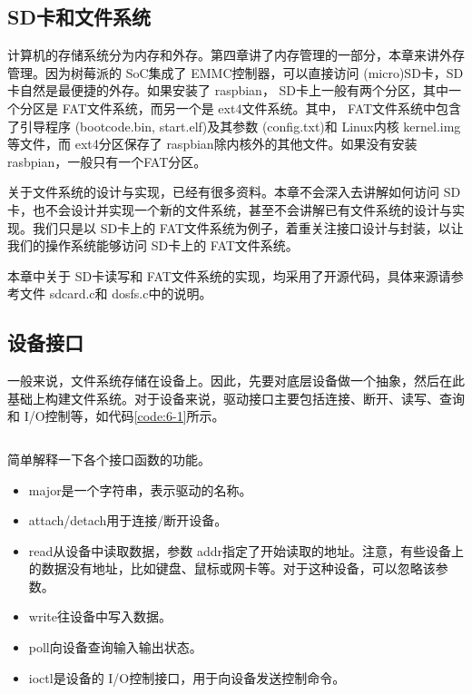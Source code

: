 \documentclass[main.tex]{subfiles}
\begin{document}
\ifxetex\else\begin{CJK*}{UTF8}{song}\fi

\chapter{SD卡和文件系统}
计算机的存储系统分为内存和外存。第四章讲了内存管理的一部分，本章来讲外存管理。因为树莓派的 SoC集成了 EMMC控制器，可以直接访问 (micro)SD卡，SD卡自然是最便捷的外存。如果安装了 rasp\-bian， SD卡上一般有两个分区，其中一个分区是 FAT文件系统，而另一个是 ext4文件系统。其中， FAT文件系统中包含了引导程序 (boot\-code.bin, start.elf)及其参数 (config.txt)和 Linux内核 kernel.img等文件，而 ext4分区保存了 rasp\-bian除内核外的其他文件。如果没有安装 rasbpian，一般只有一个FAT分区。

\par
关于文件系统的设计与实现，已经有很多资料。本章不会深入去讲解如何访问 SD卡，也不会设计并实现一个新的文件系统，甚至不会讲解已有文件系统的设计与实现。我们只是以 SD卡上的 FAT文件系统为例子，着重关注接口设计与封装，以让我们的操作系统能够访问 SD卡上的 FAT文件系统。

\par
本章中关于 SD卡读写和 FAT文件系统的实现，均采用了开源代码，具体来源请参考文件 sd\-card.c和 dos\-fs.c中的说明。

\section{设备接口}
一般来说，文件系统存储在设备上。因此，先要对底层设备做一个抽象，然后在此基础上构建文件系统。对于设备来说，驱动接口主要包括连接、断开、读写、查询和 I/O控制等，如代码\ref{code:6-1}所示。

\begin{code}
\label{code:6-1}
\inputminted[firstline=135,lastline=157,linenos,numbersep=5pt,frame=lines,framesep=2mm]{c}{src/chapter06/kernel/kernel.h}
\end{code}

\noindent
简单解释一下各个接口函数的功能。

\begin{itemize}
\item major是一个字符串，表示驱动的名称。
\item attach/detach用于连接/断开设备。
\item read从设备中读取数据，参数 addr指定了开始读取的地址。注意，有些设备上的数据没有地址，比如键盘、鼠标或网卡等。对于这种设备，可以忽略该参数。
\item write往设备中写入数据。
\item poll向设备查询输入输出状态。
\item ioctl是设备的 I/O控制接口，用于向设备发送控制命令。
\end{itemize}


\end{CJK*}
\end{document}
